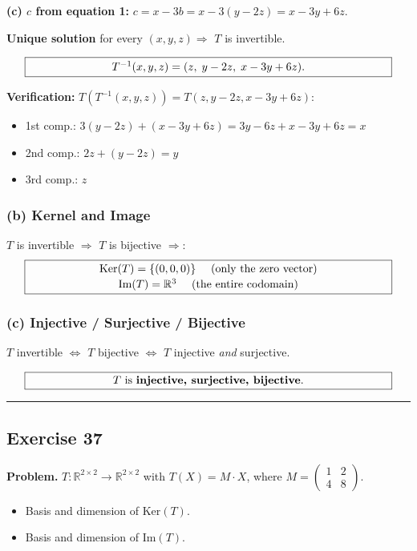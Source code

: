 \documentclass[a4paper,12pt]{article}
\begin{document}
\textbf{(c) $c$ from equation 1:} $c = x - 3b = x - 3(y - 2z) = x - 3y + 6z$.

\textbf{Unique solution} for every $(x, y, z) \Rightarrow$ $T$ is invertible.

\[
\fbox{\parbox{0.93\textwidth}{\centering
$T^{-1}(x, y, z) = (z,\; y - 2z,\; x - 3y + 6z)$.
}}
\]

\textbf{Verification:} $T(T^{-1}(x,y,z)) = T(z, y-2z, x-3y+6z)$:
\begin{itemize}[nosep, leftmargin=*]
\item 1st comp.: $3(y - 2z) + (x - 3y + 6z) = 3y - 6z + x - 3y + 6z = x$ \checkmark
\item 2nd comp.: $2z + (y - 2z) = y$ \checkmark
\item 3rd comp.: $z$ \checkmark
\end{itemize}

\subsubsection*{(b) Kernel and Image}

$T$ is invertible $\Rightarrow$ $T$ is bijective $\Rightarrow$:
\[
\fbox{\parbox{0.93\textwidth}{\centering
$\text{Ker}(T) = \{(0, 0, 0)\}$ \quad (only the zero vector) \\[2pt]
$\text{Im}(T) = \mathbb{R}^3$ \quad (the entire codomain)
}}
\]

\subsubsection*{(c) Injective / Surjective / Bijective}

$T$ invertible $\iff$ $T$ bijective $\iff$ $T$ injective \emph{and} surjective.

\[
\fbox{\parbox{0.93\textwidth}{\centering
$T$ is \textbf{injective, surjective, bijective}.
}}
\]

\bigskip
\hrule
\bigskip

\subsection*{Exercise 37}

\textbf{Problem.} $T \colon \mathbb{R}^{2 \times 2} \to \mathbb{R}^{2 \times 2}$ with $T(X) = M \cdot X$, where $M = \begin{pmatrix} 1 & 2 \\ 4 & 8 \end{pmatrix}$.
\begin{itemize}[nosep]
\item[(a)] Basis and dimension of $\text{Ker}(T)$.
\item[(b)] Basis and dimension of $\text{Im}(T)$.
\end{itemize}
\end{document}
